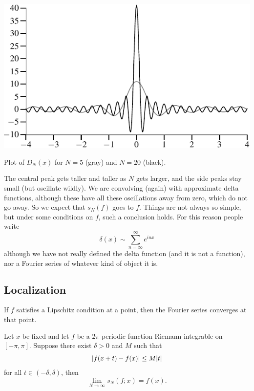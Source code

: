 \begin{myfigureht}
\includegraphics{figures/approxdeltas}
\caption{Plot of $D_N(x)$ for $N=5$ (gray) and $N=20$
(black).\label{fig:approxdeltas}}
\end{myfigureht}

The central peak gets taller and taller as $N$ gets larger,
and the side peaks stay small (but oscillate wildly).
We are convolving (again) with approximate delta functions,
although these have
all these oscillations away from zero, which do not go away.  So we expect that
$s_N(f)$ goes to $f$.  Things are not always so simple,
but under some conditions on $f$, such a conclusion holds.  For this reason
people write
\begin{equation*}
\delta(x) \sim \sum_{n=\infty}^\infty e^{inx}
\end{equation*}
although we have not really defined the delta function (and it is not a
function), nor a Fourier series of whatever kind of object it is.

\subsection{Localization}

If $f$ satisfies a Lipschitz condition at a point, then
the Fourier series converges at that point.

\begin{thm} \label{thm:fourierlocalization}
Let $x$ be fixed and let $f$ be a $2\pi$-periodic function
Riemann integrable on $[-\pi,\pi]$.  Suppose
there exist $\delta > 0$ and $M$ such that
\begin{equation*}
\lvert {f(x+t)-f(x)} \rvert \leq M \lvert {t} \rvert
\end{equation*}
for all $t \in (-\delta,\delta)$, then
\begin{equation*}
\lim_{N \to \infty} s_N(f;x) = f(x) .
\end{equation*}
\end{thm}

